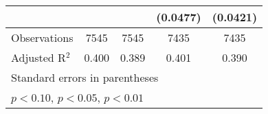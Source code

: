 \documentclass{article}
\begin{document}
\begin{landscape}
\begin{table}[htbp]
\begin{tabular}{l*{4}{c}}
                         &                     &                     &    (0.0477)         &    (0.0421)         \\
\midrule
Observations             &        7545         &        7545         &        7435         &        7435         \\
Adjusted R$^2$           &       0.400         &       0.389         &       0.401         &       0.390         \\
\bottomrule
\multicolumn{5}{l}{\footnotesize Standard errors in parentheses}\\
\multicolumn{5}{l}{\footnotesize \sym{*} \(p<0.10\), \sym{**} \(p<0.05\), \sym{***} \(p<0.01\)}\\
\end{tabular}
\end{table}
\end{landscape}
\end{document}
